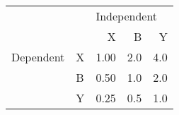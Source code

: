 \begin{tabular}{llrrr}
\toprule
          &   & \multicolumn{3}{l}{Independent} \\
          &   &           X &    B &    Y \\
\midrule
Dependent & X &        1.00 &  2.0 &  4.0 \\
          & B &        0.50 &  1.0 &  2.0 \\
          & Y &        0.25 &  0.5 &  1.0 \\
\bottomrule
\end{tabular}
